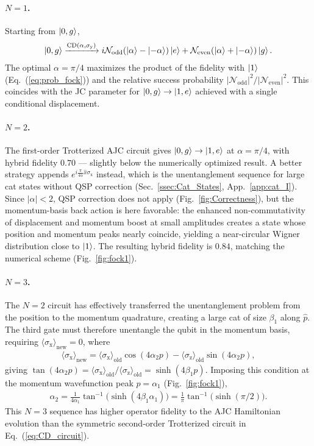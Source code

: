 \documentclass[aps,prx,showpacs,notitlepage,twocolumn,superscriptaddress,nofootinbib,preprintnumbers,floatfix,10pt, longbibliography]{revtex4-2}
\begin{document}
{\paragraph{$N=1$.}
Starting from $\ket{0,g}$,
\begin{align}
  \ket{0,g}
  \xrightarrow{\mathrm{CD}(\alpha,\sigma_\mathrm{y})}
  i\mathcal{N}_\mathrm{odd}(\ket{\alpha}-\ket{-\alpha})\ket{e}
  +\mathcal{N}_\mathrm{even}(\ket{\alpha}+\ket{-\alpha})\ket{g}.
\end{align}
The optimal $\alpha=\pi/4$ maximizes the product of the fidelity with
$\ket{1}$ (Eq.~(\ref{eq:prob_fock})) and the relative success probability
$|\mathcal{N}_\mathrm{odd}|^2/|\mathcal{N}_\mathrm{even}|^2$.  This
coincides with the JC parameter for $\ket{0,g}\to\ket{1,e}$ achieved with
a single conditional displacement.

\paragraph{$N=2$.}
The first-order Trotterized AJC circuit gives
$\ket{0,g}\to\ket{1,e}$ at $\alpha=\pi/4$, with hybrid fidelity $0.70$
— slightly below the numerically optimized result.  A better strategy
appends $e^{i\frac{\pi}{4\alpha}\hat{x}\sigma_\mathrm{x}}$ instead, which
is the unentanglement sequence for large cat states without QSP correction
(Sec.~\ref{ssec:Cat_States}, App.~\ref{app:cat_I}).  Since $|\alpha|<2$,
QSP correction does not apply (Fig.~\ref{fig:Correctness}), but the
momentum-basis back action is here favorable: the enhanced non-commutativity
of displacement and momentum boost at small amplitudes creates a state whose
position and momentum peaks nearly coincide, yielding a near-circular Wigner
distribution close to $\ket{1}$.  The resulting hybrid fidelity is $0.84$,
matching the numerical scheme (Fig.~\ref{fig:fock1}).

\paragraph{$N=3$.}
The $N=2$ circuit has effectively transferred the unentanglement problem 
from the position to the momentum quadrature, creating a large cat of size 
$\beta_1$ along $\hat{p}$. The third gate must therefore unentangle the 
qubit in the momentum basis, requiring 
$\langle\sigma_\mathrm{x}\rangle_\mathrm{new}=0$, where
\begin{align}
\langle\sigma_\mathrm{x}\rangle_\mathrm{new}
  = \langle\sigma_\mathrm{x}\rangle_\mathrm{old}\cos(4\alpha_2 p)
   -\langle\sigma_\mathrm{z}\rangle_\mathrm{old}\sin(4\alpha_2 p),
  \label{eq:sx_new}
\end{align}
giving $\tan(4\alpha_2 p)=\langle\sigma_\mathrm{x}\rangle_\mathrm{old}/
\langle\sigma_\mathrm{z}\rangle_\mathrm{old}=\sinh(4\beta_1 p)$.
Imposing this condition at the momentum wavefunction peak $p=\alpha_1$
(Fig.~\ref{fig:fock1}),
\begin{align}
  \alpha_2 = \frac{1}{4\alpha_1}\tan^{-1}\!\bigl(\sinh(4\beta_1\alpha_1)\bigr)
           = \frac{1}{\pi}\tan^{-1}\!\bigl(\sinh(\pi/2)\bigr).
\end{align}
This $N=3$ sequence has higher operator fidelity to the AJC Hamiltonian
evolution than the symmetric second-order Trotterized circuit in
Eq.~(\ref{eq:CD_circuit}).
}
\end{document}
